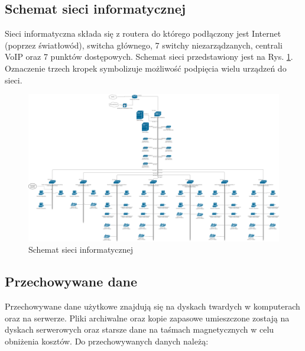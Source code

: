 \newpage
\subsection{Schemat sieci informatycznej}
Sieci informatyczna składa się z routera do którego podłączony jest \linebreak Internet (poprzez światłowód), switcha głównego, 7 switchy niezarządzanych, centrali VoIP oraz 7 punktów dostępowych. Schemat sieci przedstawiony jest na Rys. \ref{schemat:schemat_sieci_infor}. Oznaczenie trzech kropek symbolizuje możliwość podpięcia wielu urządzeń do sieci.

\begin{landscape}
\begin{figure}[!h]
	\includegraphics[width=24cm]{Schemat_sieci.png}
	\caption{Schemat sieci informatycznej}
	\label{schemat:schemat_sieci_infor}
\end{figure}
\end{landscape}

\newpage
\subsection{Przechowywane dane}
Przechowywane dane użytkowe znajdują się na dyskach twardych \linebreak w komputerach oraz na serwerze. Pliki archiwalne oraz kopie zapasowe umieszczone zostają na dyskach serwerowych oraz starsze dane na taśmach magnetycznych w celu obniżenia kosztów. Do przechowywanych danych \linebreak należą:

